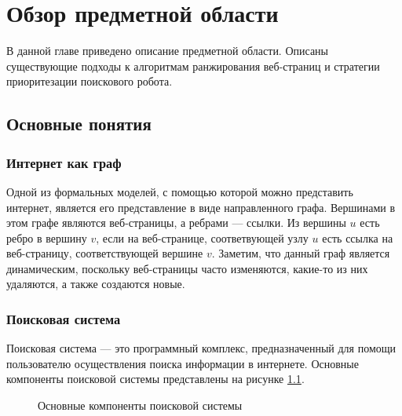 \chapter{Обзор предметной области}

В данной главе приведено описание предметной области. Описаны существующие подходы к алгоритмам ранжирования веб-страниц и стратегии приоритезации поискового робота.

\section{Основные понятия}

\subsection{Интернет как граф}
\label{webgraph}

Одной из формальных моделей, с помощью которой можно представить интернет, является его представление в виде направленного графа. Вершинами в этом графе являются веб-страницы, а ребрами --- ссылки. Из вершины $u$ есть ребро в вершину $v$, если на веб-странице, соответвующей узлу $u$ есть ссылка на веб-страницу, соответствующей вершине $v$. Заметим, что данный граф является динамическим, поскольку веб-страницы часто изменяются, какие-то из них удаляются, а также создаются новые. 

\subsection{Поисковая система}

Поисковая система --- это программный комплекс, предназначенный для помощи пользователю осуществления поиска информации в интернете. Основные компоненты поисковой системы представлены на рисунке \ref{poisk}. 

\begin{figure}[h!]
\caption{Основные компоненты поисковой системы}
\label{poisk}
\end{figure}

